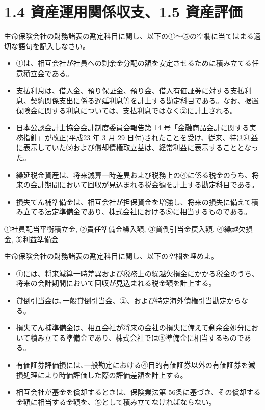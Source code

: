 \documentclass[report,gutter=10mm,fore-edge=10mm,uplatex,dvipdfmx]{jlreq}
\begin{document}

\section{1.4 資産運用関係収支、1.5
資産評価}


生命保険会社の財務諸表の勘定科目に関し、以下の①～⑤の空欄に当てはまる適切な語句を記入しなさい。
\begin{itemize}
 \item ①は、相互会社が社員への剰余金分配の額を安定させるために積み立てる任意積立金である。
\item 支払利息は、借入金、預り保証金、預り金、借入有価証券に対する支払利息、契約関係支出に係る遅延利息等を計上する勘定科目である。なお、据置保険金に関する利息については、支払利息ではなく②に計上される。
\item 日本公認会計士協会会計制度委員会報告第 14 号「金融商品会計に関する実務指針」が改正(平成23 年 3 月 29 日付)されたことを受け、従来、特別利益に表示していた③および償却債権取立益は、経常利益に表示することとなった。
\item 繰延税金資産は、将来減算一時差異および税務上の④に係る税金のうち、将来の会計期間において回収が見込まれる税金額を計上する勘定科目である。
\item 損失てん補準備金は、相互会社が担保資金を増強し、将来の損失に備えて積み立てる法定準備金であり、株式会社における⑤に相当するものである。
\end{itemize}



①社員配当平衡積立金, ②責任準備金繰入額, ③貸倒引当金戻入額, ④繰越欠損金,
⑤利益準備金


生命保険会社の財務諸表の勘定科目に関し、以下の空欄を埋めよ。

\begin{itemize}
\item ①には、将来減算一時差異および税務上の繰越欠損金にかかる税金のうち、将来の会計期間において回収が見込まれる税金額を計上する。
\item 貸倒引当金は､一般貸倒引当金、②、および特定海外債権引当勘定からなる。
\item 損失てん補準備金は、相互会社が将来の会社の損失に備えて剰余金処分において積み立てる準備金であり、株式会社では③準備金に相当するものである。
\item 有価証券評価損には､一般勘定における④目的有価証券以外の有価証券を減損処理により時価評価した際の評価差額を計上する。
\item 相互会社が基金を償却するときは、保険業法第 56条に基づき、その償却する金額に相当する金額を、⑤として積み立てなければならない。
\end{itemize}
\end{document}
